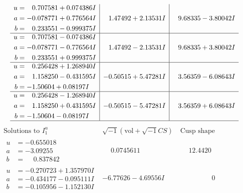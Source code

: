 \documentclass[1p]{elsarticle_modified}
\theoremstyle{definition}
\newcommand{\I}{\sqrt{-1}}
\begin{document}
$$\begin{array}{c|c|c}
\begin{aligned}
u &= \phantom{-}0.707581 + 0.074386 I \\
a &= -0.078771 + 0.776564 I \\
b &= \phantom{-}0.233551 - 0.999375 I\end{aligned}
 & \phantom{-}1.47492 + 2.13531 I & \phantom{-}9.68335 - 3.80042 I \\ \hline\begin{aligned}
u &= \phantom{-}0.707581 - 0.074386 I \\
a &= -0.078771 - 0.776564 I \\
b &= \phantom{-}0.233551 + 0.999375 I\end{aligned}
 & \phantom{-}1.47492 - 2.13531 I & \phantom{-}9.68335 + 3.80042 I \\ \hline\begin{aligned}
u &= \phantom{-}0.256428 + 1.268940 I \\
a &= \phantom{-}1.158250 - 0.431595 I \\
b &= -1.50604 + 0.08197 I\end{aligned}
 & -0.50515 + 5.47281 I & \phantom{-}3.56359 - 6.08643 I \\ \hline\begin{aligned}
u &= \phantom{-}0.256428 - 1.268940 I \\
a &= \phantom{-}1.158250 + 0.431595 I \\
b &= -1.50604 - 0.08197 I\end{aligned}
 & -0.50515 - 5.47281 I & \phantom{-}3.56359 + 6.08643 I\\
 \hline 
 \end{array}$$\newpage$$\begin{array}{c|c|c}  
\text{Solutions to }I^u_{1}& \I (\text{vol} + \sqrt{-1}CS) & \text{Cusp shape}\\
 \hline 
\begin{aligned}
u &= -0.655018\phantom{ +0.000000I} \\
a &= -3.09255\phantom{ +0.000000I} \\
b &= \phantom{-}0.837842\phantom{ +0.000000I}\end{aligned}
 & \phantom{-}0.0745611\phantom{ +0.000000I} & \phantom{-}12.4420\phantom{ +0.000000I} \\ \hline\begin{aligned}
u &= -0.270723 + 1.357970 I \\
a &= -0.434177 - 0.095111 I \\
b &= -0.105956 - 1.152130 I\end{aligned}
 & -6.77626 - 4.69556 I & \phantom{-0.000000 } 0 \\ \hline\begin{aligned}

\end{aligned}
\end{array}$$
\end{document}
